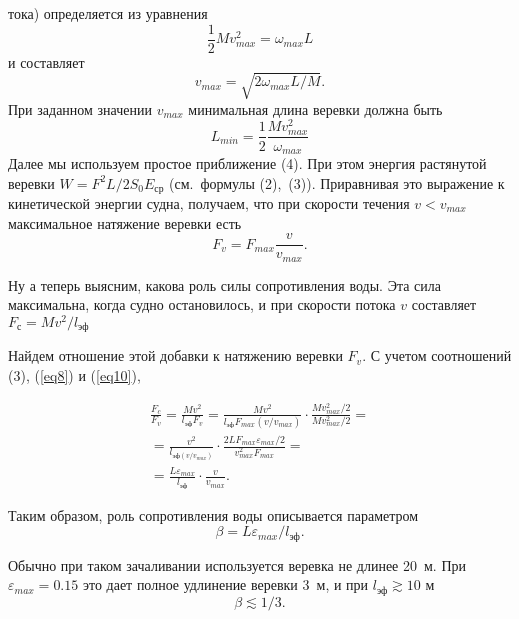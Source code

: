 \documentclass[12pt,a4paper]{article}
\begin{document}
\thispagestyle{empty}
\setlength{\abovedisplayskip}{3pt}
\setlength{\belowdisplayskip}{3pt}
\captionsetup[figure]{labelfont=it,textfont=it,singlelinecheck=off,justification=raggedright}

\begin{multicols}{2}
\noindent тока) определяется из уравнения
$$\frac{1}{2}Mv^2_{max} = \omega_{max}L$$
и составляет
\begin{equation}\label{eq8}
v_{max} = \sqrt{2\omega_{max}L/M}. \tag{8}
\end{equation}   
При заданном значении $v_{max}$ минимальная длина веревки должна быть
\begin{equation}\label{eq9}
L_{min} = \frac{1}{2}\frac{Mv^2_{max}}{\omega_{max}} \tag{9}
\end{equation}   
Далее мы используем простое приближение (4). При этом энергия растянутой веревки ${W = F^2L/2S_0E_{\text{ср}}}$ (см.~формулы (2),~(3)). Приравнивая это выражение к кинетической энергии судна, получаем, что при скорости течения ${v<v_{max}}$ максимальное натяжение веревки есть
\begin{equation}\label{eq10}
F_{v} = F_{max}\frac{v}{v_{max}}. \tag{10}
\end{equation}

Ну а теперь выясним, какова роль силы сопротивления воды. Эта сила максимальна, когда судно остановилось, и при скорости потока $v$ составляет ${F_{\text{с}}=Mv^2/l_{\text{эф}}}$

Найдем отношение этой добавки к натяжению веревки $F_v$. С учетом соотношений (3), (\ref{eq8}) и (\ref{eq10}),
\begin{scriptsize}
    \begin{center}
    \begin{align*}
        \frac{F_c}{F_v}=\frac{Mv^2}{l_{\text{эф}}F_v}=\frac{Mv^2}{l_{\text{эф}}F_{max}(v/v_{max})}\cdot\frac{Mv^2_{max}/2}{Mv^2_{max}/2} =\\
        =\frac{v^2}{l_{\text{эф}(v/v_{max})}}\cdot\frac{2LF_{max}\varepsilon_{max}/2}{v^2_{max}F_{max}} =\\
        =\frac{L\varepsilon_{max}}{l_{\text{эф}}}\cdot\frac{v}{v_{max}}.
    \end{align*}
    \end{center}
\end{scriptsize}
\noindent
Таким образом, роль сопротивления воды описывается параметром
$$\beta=L\varepsilon_{max}/l_{\text{эф}}.$$

Обычно при таком зачаливании используется веревка не длинее 20~м. При $\varepsilon_{max} = 0.15$ это дает полное удлинение веревки 3~м, и при $l_{\text{эф}}\gtrsim10\text{ м}$
$$\beta\lesssim1/3. $$


\end{multicols}
\end{document}
